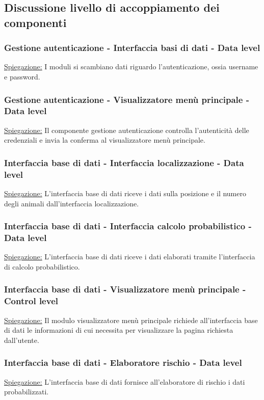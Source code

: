 \subsection{Discussione livello di accoppiamento dei componenti}

\subsubsection*{Gestione autenticazione - Interfaccia basi di dati - Data level}
\underline{Spiegazione:} I moduli si scambiano dati riguardo l'autenticazione, ossia username e password.

\subsubsection*{Gestione autenticazione - Visualizzatore menù principale - Data level}
\underline{Spiegazione:} Il componente gestione autenticazione controlla l'autenticità delle credenziali e invia la conferma al visualizzatore menù principale.

\subsubsection*{Interfaccia base di dati - Interfaccia localizzazione - Data level}
\underline{Spiegazione:} L'interfaccia base di dati riceve i dati sulla posizione e il numero degli animali dall'interfaccia localizzazione.

\subsubsection*{Interfaccia base di dati - Interfaccia calcolo probabilistico - Data level}
\underline{Spiegazione:} L'interfaccia base di dati riceve i dati elaborati tramite l'interfaccia di calcolo probabilistico.

\subsubsection*{Interfaccia base di dati - Visualizzatore menù principale - Control level}
\underline{Spiegazione:} Il modulo visualizzatore menù principale richiede all'interfaccia base di dati le informazioni di cui necessita per visualizzare la pagina richiesta dall'utente.

\subsubsection*{Interfaccia base di dati - Elaboratore rischio - Data level}
\underline{Spiegazione:} L'interfaccia base di dati fornisce all'elaboratore di rischio i dati probabilizzati. 

